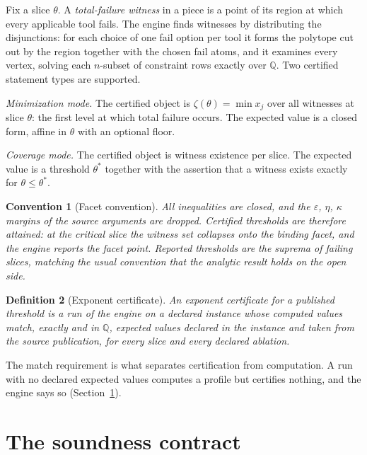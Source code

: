 \documentclass[11pt]{article}
\newtheorem{definition}{Definition}[section]
\newtheorem{convention}[definition]{Convention}
\newcommand{\Q}{\mathbb{Q}}
\begin{document}
Fix a slice $\theta$. A \emph{total-failure witness} in a piece is a
point of its region at which every applicable tool fails. The engine
finds witnesses by distributing the disjunctions: for each choice of
one fail option per tool it forms the polytope cut out by the region
together with the chosen fail atoms, and it examines every vertex,
solving each $n$-subset of constraint rows exactly over $\Q$. Two
certified statement types are supported.

\emph{Minimization mode.} The certified object is
$\zeta(\theta)=\min x_j$ over all witnesses at slice $\theta$: the
first level at which total failure occurs. The expected value is a
closed form, affine in $\theta$ with an optional floor.

\emph{Coverage mode.} The certified object is witness existence per
slice. The expected value is a threshold $\theta^*$ together with the
assertion that a witness exists exactly for $\theta\le\theta^*$.

\begin{convention}[Facet convention]\label{conv:facet}
All inequalities are closed, and the $\varepsilon$, $\eta$, $\kappa$
margins of the source arguments are dropped. Certified thresholds are
therefore attained: at the critical slice the witness set collapses
onto the binding facet, and the engine reports the facet point. Reported
thresholds are the suprema of failing slices, matching the usual
convention that the analytic result holds on the open side.
\end{convention}

\begin{definition}[Exponent certificate]\label{def:cert}
An \emph{exponent certificate} for a published threshold is a run of
the engine on a declared instance whose computed values match, exactly
and in $\Q$, expected values declared in the instance and taken from
the source publication, for every slice and every declared ablation.
\end{definition}

The match requirement is what separates certification from
computation. A run with no declared expected values computes a profile
but certifies nothing, and the engine says so
(Section~\ref{sec:verdicts}).

\section{The soundness contract}\label{sec:verdicts}
\end{document}
